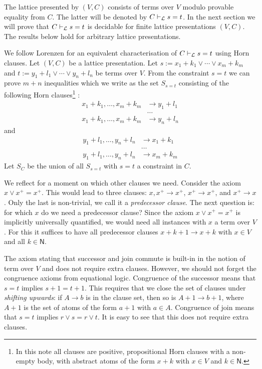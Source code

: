 \documentclass[11pt,a4paper]{article}
\newcommand{\N}{\mathsf{N}}
\newcommand\jterm[3]{{{#1_1}+{#2_1}}\vee\cdots\vee{{#1_#3}+{#2_#3}}}
\newcommand\jbody[3]{{{#1_1}+{#2_1}},\ldots,{{#1_#3}+{#2_#3}}}
\newcommand\lathy{{\cal L}}
\newcommand\prvL{\vdash_{\lathy}}
\begin{document}
The lattice presented by $(V,C)$ consists of terms over $V$
modulo provable equality from $C$. The latter will be denoted
by $C\prvL s=t$. In the next section we will prove that
$C\prvL s=t$ is decidable for finite lattice presentations $(V,C)$.
The results below hold for arbitrary lattice presentations.

We follow Lorenzen \cite[Section 2]{Lorenzen51} for an equivalent 
characterisation of $C\prvL s=t$ using Horn clauses.
Let $(V,C)$ be a lattice presentation.
Let $s:= \jterm{x}{k}{m}$ and $t:= \jterm{y}{l}{n}$ be
terms over $V$. From the constraint $s=t$
we can prove $m+n$ inequalities which we write as 
the set $S_{s=t}$ consisting of the following 
Horn clauses\footnote{In this note all clauses are positive,
propositional Horn clauses with a non-empty body,
with abstract atoms of the form $x+k$ with $x\in V$ and $k\in \N$.}
:
\begin{align*}
\jbody{x}{k}{m} &\to y_1+l_1 \\
&\ldots  \\
\jbody{x}{k}{m} &\to y_n+l_n 
\end{align*}
and
\begin{align*}
\jbody{y}{l}{n} &\to x_1+k_1 \\
&\ldots \\
\jbody{y}{l}{n} &\to x_m+k_m 
\end{align*}
Let $S_C$ be the union of all $S_{s=t}$ with $s=t$ 
a constraint in $C$.

We reflect for a moment on which other clauses we need.
Consider the axiom $x \vee x^+ = x^+$. This would lead to three
clauses: $x,x^+ \to x^+$, $x^+ \to x^+$, and $x^+ \to x$.
Only the last is non-trivial, we call it a \emph{predecessor clause}.
The next question is: for which $x$ do we need a predecessor clause?
Since the axiom $x \vee x^+ = x^+$ is implicitly universally quantified,
we would need all instances with $x$ a term over $V$.
For this it suffices to have all predecessor clauses
$x+k+1 \to x+k$ with $x\in V$ and all $k\in \N$.

The axiom stating that successor and join commute is built-in
in the notion of term over $V$ and does not require extra clauses.
However, we should not forget the congruence axioms from
equational logic. Congruence of the successor means that $s=t$
implies $s+1=t+1$. This requires that we close the set of clauses
under \emph{shifting upwards}: if $A\to b$ is in the clause set,
then so is $A+1\to b+1$, where $A+1$ is the set of atoms of
the form $a+1$ with $a\in A$. 
Congruence of join means that $s=t$ implies $r\vee s=r\vee t$.
It is easy to see that this does not require extra clauses. 
\end{document}
